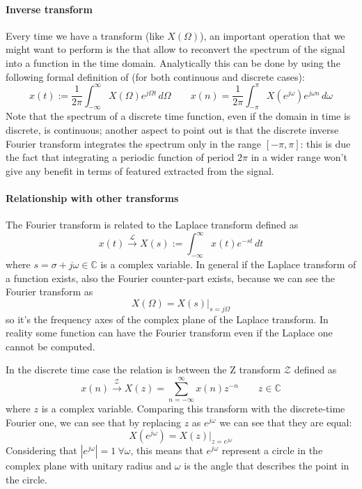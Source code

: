 	\paragraph{Inverse transform} Every time we have a transform (like $X(\Omega)$), an important operation that we might want to perform is the  that allow to reconvert the spectrum of the signal into a function in the time domain. Analytically this can be done by using the following formal definition of  (for both continuous and discrete cases):
	\begin{equation}
		x(t) := \frac 1 {2\pi} \int_{-\infty}^\infty X(\Omega) e^{j\Omega t} \, d\Omega \qquad x(n) = \frac 1{2\pi} \int_{-\pi}^\pi X\left(e^{j\omega}\right) e^{j\omega n}\, d\omega
	\end{equation}
	Note that the spectrum of a discrete time function, even if the domain in time is discrete, is continuous; another aspect to point out is that the discrete inverse Fourier transform integrates the spectrum only in the range $[-\pi,\pi]$: this is due the fact that integrating a periodic function of period $2\pi$ in a wider range won't give any benefit in terms of featured extracted from the signal.

	\paragraph{Relationship with other transforms} The Fourier transform is related to the Laplace transform defined as
	\[x(t) \xrightarrow{\mathscr{L}} X(s) := \int_{-\infty}^\infty x(t) e^{-st} \, dt \]
	where $s = \sigma + j\omega \in \mathds C$ is a complex variable. In general if the Laplace transform of a function exists, also the Fourier counter-part exists, because we can see the Fourier transform as
	\[ X(\Omega) = X(s) \big|_{s = j\Omega} \]
	so it's the frequency axes of the complex plane of the Laplace transform. In reality some function can have the Fourier transform even if the Laplace one cannot be computed.
	
	In the discrete time case the relation is between the Z transform $\mathscr{Z}$ defined as
	\[x(n) \xrightarrow{\mathscr{Z}} X(z) = \sum_{n=-\infty}^{\infty} x(n) z^{-n}  \qquad z \in \mathds C \]
	where $z$ is a complex variable. Comparing this transform with the discrete-time Fourier one, we can see that by replacing $z$ as $e^{j\omega}$ we can see that they are equal:
	\[ X\left(e^{j\omega} \right) = X(z) \big|_{z = e^{j\omega}}\]
	Considering that $|e^{j\omega}| = 1 \ \forall \omega$, this means that $e^{j\omega}$ represent a circle in the complex plane with unitary radius and $\omega$ is the angle that describes the point in the circle.
	
